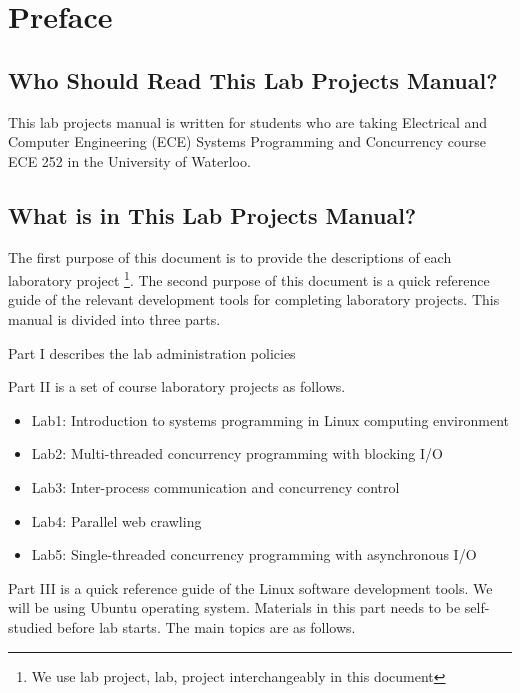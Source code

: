 \frontmatter 



\chapter{Preface}

\section*{Who Should Read This Lab Projects Manual?}
This lab projects manual is written for students who are taking Electrical and Computer Engineering (ECE) Systems Programming and Concurrency course ECE 252 in the University of Waterloo.

\section*{What is in This Lab Projects Manual?}

The first purpose of this document is to provide the descriptions of each laboratory project
\footnote{We use lab project, lab, project interchangeably in this document}.
The second purpose of this document is a quick reference guide of the relevant development tools 
for completing laboratory projects. This manual is divided into three parts. 

Part I describes the lab administration policies 

Part II is a set of course laboratory projects as follows.

\begin{itemize}
    \item Lab1: Introduction to systems programming in Linux computing environment
    \item Lab2: Multi-threaded concurrency programming with blocking I/O
    \item Lab3: Inter-process communication and concurrency control
    \item Lab4: Parallel web crawling
    \item Lab5: Single-threaded concurrency programming with asynchronous I/O  
\end{itemize}

Part III is a quick reference guide of the Linux software development tools. We will be using Ubuntu operating system. Materials in this part needs to be self-studied before lab starts.
The main topics are as follows.

